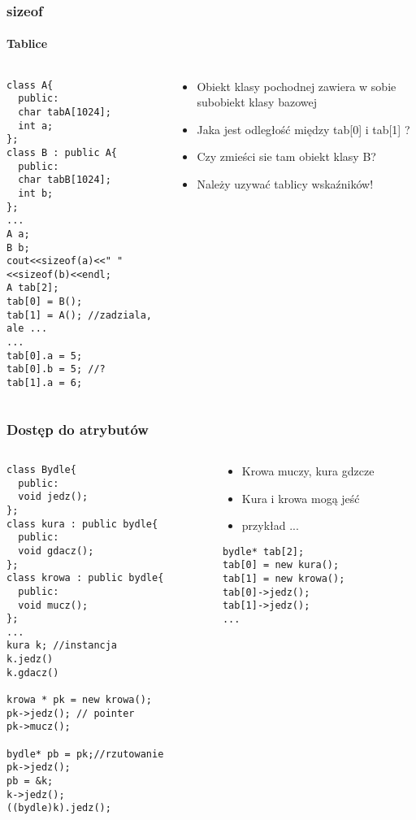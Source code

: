 \documentclass[10pt]{beamer}
\begin{document}
\begin{frame}[fragile]
  \frametitle{sizeof}
  \framesubtitle{Tablice}
  \begin{columns}
    \begin{column}{0.49\textwidth}
\begin{lstlisting}
class A{
  public:
  char tabA[1024];
  int a;
};
class B : public A{
  public:
  char tabB[1024];
  int b;
};
...
A a;
B b;
cout<<sizeof(a)<<" "<<sizeof(b)<<endl;
A tab[2];
tab[0] = B();
tab[1] = A(); //zadziala, ale ...
...
tab[0].a = 5;
tab[0].b = 5; //?
tab[1].a = 6;
\end{lstlisting}
    \end{column}
    \begin{column}{0.49\textwidth}
    \begin{itemize}
  \item Obiekt klasy pochodnej zawiera w sobie subobiekt klasy bazowej
  \item Jaka jest odległość między tab[0] i tab[1] ?
  \item Czy zmieści sie tam obiekt klasy B?
  \item Należy uzywać tablicy wskaźników!
\end{itemize}
    \end{column}
  \end{columns}
\end{frame}

\begin{frame}[fragile]
  \frametitle{Dostęp do atrybutów}
  \begin{columns}
    \begin{column}{0.49\textwidth}
      \begin{lstlisting}
class Bydle{
  public:
  void jedz();
};
class kura : public bydle{
  public:
  void gdacz();
};
class krowa : public bydle{
  public:
  void mucz();
};
...
kura k; //instancja
k.jedz()
k.gdacz()

krowa * pk = new krowa();
pk->jedz(); // pointer
pk->mucz();

bydle* pb = pk;//rzutowanie
pk->jedz();
pb = &k;
k->jedz();
((bydle)k).jedz();
\end{lstlisting}
    \end{column}
    \begin{column}{0.49\textwidth}
    \begin{itemize}
  \item Krowa muczy, kura gdzcze
  \item Kura i krowa mogą jeść
  \item przykład ...
\end{itemize}
\begin{lstlisting}
bydle* tab[2];
tab[0] = new kura();
tab[1] = new krowa();
tab[0]->jedz();
tab[1]->jedz();
...
\end{lstlisting}
    \end{column}
  \end{columns}
\end{frame}
\end{document}
